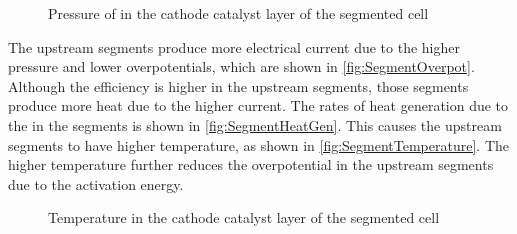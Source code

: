 \begin{figure}[htbp]
  \caption{Pressure of  in the cathode catalyst layer of the segmented cell}
  \label{fig:SegmentO2Pressure}
\end{figure}

The upstream segments produce more electrical current due to the higher  pressure and lower overpotentials, which are shown in \autoref{fig:SegmentOverpot}.  Although the efficiency is higher in the upstream segments, those segments produce more heat due to the higher current.  The rates of heat generation due to the  in the segments is shown in \autoref{fig:SegmentHeatGen}.  This causes the upstream segments to have higher temperature, as shown in \autoref{fig:SegmentTemperature}.  The higher temperature further reduces the overpotential in the upstream segments due to the activation energy.

\begin{figure}[htbp]
  \caption{Temperature in the cathode catalyst layer of the segmented cell}
  \label{fig:SegmentTemperature}
\end{figure}

